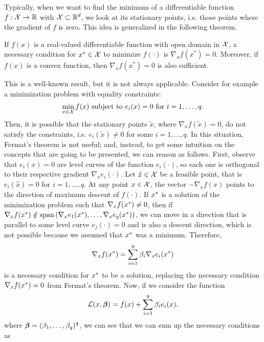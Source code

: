 Typically, when we want to find the minimum of a differentiable function $f: \mathcal{X} \to \mathbb{R}$ with $\mathcal{X} \subset \mathbb{R}^d$, we look at its stationary points, i.e. those points where the gradient of $f$ is zero. This idea is generalized in the following theorem.
\begin{theorem}
    If $f(x)$ is a real-valued differentiable function with open domain in $\mathcal{X}$, a necessary condition for $x^* \in \mathcal{X}$ to minimize $f(\cdot)$ is $\nabla_x f(x^*) = 0$. Moreover, if $f(x)$ is a convex function, then $\nabla_x f(x^*) = 0$ is also sufficient.
\end{theorem}
This is a well-known result, but it is not always applicable. Consider for example a minimization problem with equality constraints:
$$ \min_{x \in \mathcal{X}} f(x) \text{ subject to } e_i(x)=0 \text{ for } i=1, \ldots, q .$$
Then, it is possible that the stationary points $\tilde{x}$, where $\nabla_x f(\tilde{x}) = 0$, do not satisfy the constraints, i.e. $e_i(\tilde{x}) \neq 0$ for some $i=1, \ldots, q$. In this situation, Fermat's theorem is not useful; and, instead, to get some intuition on the concepts that are going to be presented, we can reason as follows. 
%
First, observe that $e_i(x)=0$ are level curves of the function $e_i(\cdot)$, so each one is orthogonal to their respective gradient $\nabla_x e_i(\cdot)$.  Let $\hat{x} \in \mathcal{X}$ be a feasible point, that is $e_i(\hat{x})=0$ for $i=1, \ldots, q$.
At any point $x \in \mathcal{X}$, the vector $-\nabla_x f(x)$ points to the direction of maximum descent of $f(\cdot)$.
If ${x}^*$ is a solution of the minimization problem such that $\nabla_x f({x}^*) \neq 0$, then if $\nabla_x f({x}^*) \notin \operatorname{span}\left(\nabla_x e_1({x}^*), \ldots, \nabla_x e_q({x}^*) \right)$, we can move in a direction that is parallel to some level curve $e_j(\cdot)=0$ and is also a descent direction, which is not possible because we assumed that ${x}^*$ was a minimum.
Therefore,
\begin{equation}
    \label{eq:intuition_lagr}
    \nabla_x f(\opt{x}) = \sum_{i=1}^q \beta_i \nabla_x e_i(\opt{x})
\end{equation}
is a necessary condition for ${x}^*$ to be a solution, replacing the necessary condition $\nabla_x f({x}^*) = 0$ from Fermat's theorem.
%
Now, if we consider the function $$\mathcal{L}(x, \bm{\beta}) = f(x) + \sum_{i=1}^q \beta_i e_i(x),$$ where $\bm{\beta} = (\beta_1, \ldots, \beta_q)^\intercal$, we can see that we can sum up the necessary conditions as 
